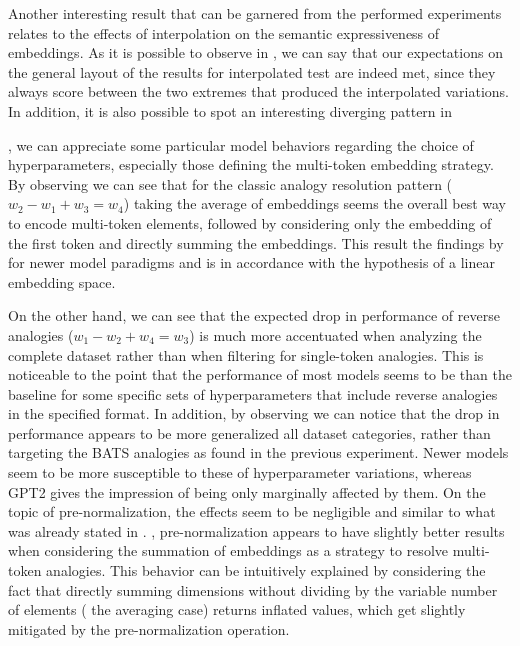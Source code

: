 
Another interesting result that can be garnered from the performed experiments relates to the effects of interpolation on the semantic expressiveness of embeddings.
As it is possible to observe in , we can say that our expectations on the general layout of the results for interpolated test are indeed met, since they always score between the two extremes that produced the interpolated variations.
In addition, it is also possible to spot an interesting diverging pattern in


, we can appreciate some particular model behaviors regarding the choice of hyperparameters, especially those defining the multi-token embedding strategy.
By observing  we can see that for the classic analogy resolution pattern ($w_2 - w_1 + w_3 = w_4$) taking the average of embeddings seems the overall best way to encode multi-token elements, followed by considering only the embedding of the first token and directly summing the embeddings.
This result  the findings  by  for newer model paradigms and is in accordance with the hypothesis of a linear embedding space.

On the other hand, we can see that the expected drop in performance of reverse analogies ($w_1 - w_2 + w_4 = w_3$) is much more accentuated when analyzing the complete dataset rather than when filtering for single-token analogies.
This is noticeable to the point that the performance of most models seems to be  than the baseline for some specific sets of hyperparameters that include reverse analogies in the specified format.
In addition, by observing  we can notice that the drop in performance appears to be more generalized  all dataset categories, rather than targeting the BATS analogies as found in the previous experiment.
Newer models seem to be more susceptible to these  of hyperparameter variations, whereas GPT2 gives the impression of being only marginally affected by them.
On the topic of pre-normalization, the effects seem to be negligible and similar to what was already stated in .
, pre-normalization appears to have slightly better results when considering the summation of embeddings as a strategy to resolve multi-token analogies.
This behavior can be intuitively explained by considering the fact that directly summing dimensions without dividing by the variable number of elements ( the averaging case) returns inflated values, which get slightly mitigated by the pre-normalization operation.

